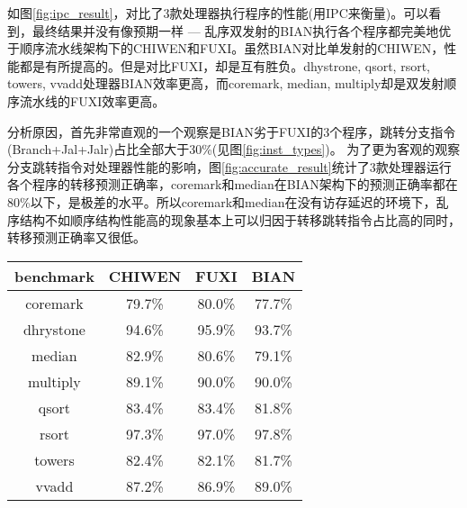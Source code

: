 如图\ref{fig:ipc_result}，对比了3款处理器执行程序的性能(用IPC来衡量)。可以看到，最终结果并没有像预期一样 --- 乱序双发射的BIAN执行各个程序都完美地优于顺序流水线架构下的CHIWEN和FUXI。虽然BIAN对比单发射的CHIWEN，性能都是有所提高的。但是对比FUXI，却是互有胜负。dhystrone, qsort, rsort, towers, vvadd处理器BIAN效率更高，而coremark, median, multiply却是双发射顺序流水线的FUXI效率更高。

分析原因，首先非常直观的一个观察是BIAN劣于FUXI的3个程序，跳转分支指令(Branch+Jal+Jalr)占比全部大于30\%(见图\ref{fig:inst_types})。 为了更为客观的观察分支跳转指令对处理器性能的影响，图\ref{fig:accurate_result}统计了3款处理器运行各个程序的转移预测正确率，coremark和median在BIAN架构下的预测正确率都在80\%以下，是极差的水平。所以coremark和median在没有访存延迟的环境下，乱序结构不如顺序结构性能高的现象基本上可以归因于转移跳转指令占比高的同时，转移预测正确率又很低。
\begin{table}[!htbp]
	\label{tab:accurate_result}
	\centering
	\footnotesize%
	\setlength{\tabcolsep}{4pt}%
	\renewcommand{\arraystretch}{1.2}%
	\begin{tabular}{cccc}
		\hline
		benchmark & CHIWEN & FUXI & BIAN \\%
		\hline
		coremark    & 79.7\% & 80.0\% & 77.7\% \\
		dhrystone   & 94.6\% & 95.9\% & 93.7\% \\
		median 		& 82.9\% & 80.6\% & 79.1\% \\
		multiply 	& 89.1\% & 90.0\% & 90.0\% \\
		qsort  		& 83.4\% & 83.4\% & 81.8\% \\
		rsort  		& 97.3\% & 97.0\% & 97.8\% \\
		towers 		& 82.4\% & 82.1\% & 81.7\% \\
		vvadd 		& 87.2\% & 86.9\% & 89.0\% \\
		\hline
	\end{tabular}
\end{table}

